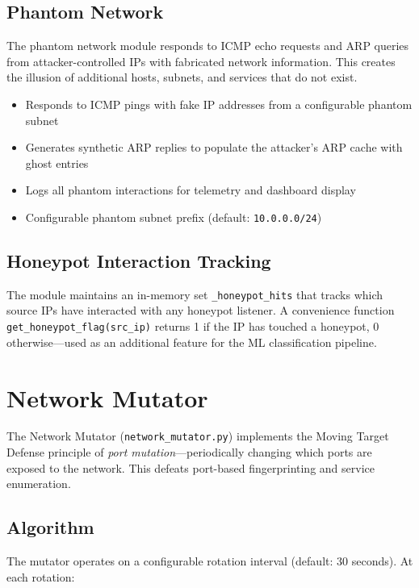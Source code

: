 \documentclass[12pt,a4paper]{report}
\begin{document}
\subsection{Phantom Network}

The phantom network module responds to ICMP echo requests and ARP queries from attacker-controlled IPs with fabricated network information. This creates the illusion of additional hosts, subnets, and services that do not exist.

\begin{itemize}
    \item Responds to ICMP pings with fake IP addresses from a configurable phantom subnet
    \item Generates synthetic ARP replies to populate the attacker's ARP cache with ghost entries
    \item Logs all phantom interactions for telemetry and dashboard display
    \item Configurable phantom subnet prefix (default: \texttt{10.0.0.0/24})
\end{itemize}

\subsection{Honeypot Interaction Tracking}

The module maintains an in-memory set \texttt{\_honeypot\_hits} that tracks which source IPs have interacted with any honeypot listener. A convenience function \texttt{get\_honeypot\_flag(src\_ip)} returns 1 if the IP has touched a honeypot, 0 otherwise---used as an additional feature for the ML classification pipeline.

\section{Network Mutator}

The Network Mutator (\texttt{network\_mutator.py}) implements the Moving Target Defense principle of \emph{port mutation}---periodically changing which ports are exposed to the network. This defeats port-based fingerprinting and service enumeration.

\subsection{Algorithm}

The mutator operates on a configurable rotation interval (default: 30 seconds). At each rotation:
\end{document}

